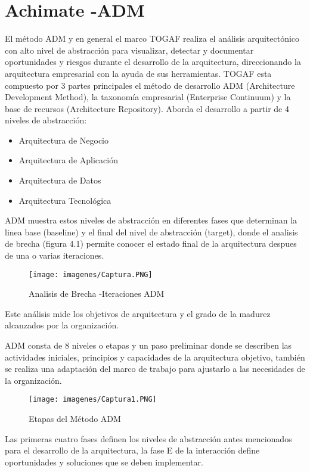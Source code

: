 \chapter{Achimate -ADM}

El método ADM y en general el marco TOGAF realiza el análisis arquitectónico con alto nivel de abstracción para visualizar, detectar y
	documentar oportunidades y riesgos durante el desarrollo de la arquitectura, direccionando la arquitectura empresarial con la ayuda de sus herramientas.
TOGAF esta compuesto por 3 partes principales el método de desarrollo ADM (Architecture Development Method), la taxonomía empresarial (Enterprise Continuum) y la base de recursos (Architecture Repository). Aborda el desarrollo a partir de 4 niveles de abstracción:
\begin{itemize}
	\item Arquitectura de Negocio
	\item Arquitectura de Aplicación
	\item Arquitectura de Datos
	\item Arquitectura Tecnológica
\end{itemize}
ADM muestra estos niveles de abstracción en diferentes fases que determinan la linea base (baseline) y el final del nivel de abstracción (target), donde el analisis de brecha (figura 4.1) permite conocer el estado final de la arquitectura despues de una o varias iteraciones.
\begin{figure}[h]
	\centering
	\texttt{[image: imagenes/Captura.PNG]}
	\caption{Analisis de Brecha -Iteraciones ADM}
	\label{fig:gap_analysis}
\end{figure}

Este análisis mide los objetivos de arquitectura y el grado de la madurez alcanzados por la organización.

ADM consta de 8  niveles o etapas y un paso preliminar donde se describen las actividades iniciales, principios y capacidades de la arquitectura objetivo, también se realiza una adaptación del marco de trabajo para ajustarlo a las necesidades de la organización.
\cite{FGuti}

\begin{figure}[h]
	\centering
	\texttt{[image: imagenes/Captura1.PNG]}
	\caption{Etapas del Método ADM}
	\label{fig:gap_analysis}
\end{figure}

Las primeras cuatro fases definen los niveles de abstracción antes mencionados para el desarrollo de la arquitectura, la fase E de la interacción define oportunidades y soluciones que se deben implementar.

